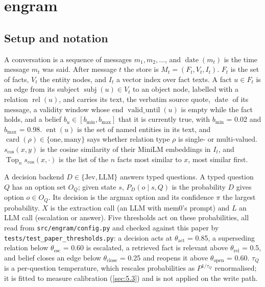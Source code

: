 \documentclass[11pt]{article}
\newcommand{\src}[1]{}
\begin{document}
\section{engram}\label{sec:3}
\subsection{Setup and notation}\label{sec:3.1}
A conversation is a sequence of messages $m_1, m_2, \ldots$, and $\operatorname{date}(m_t)$ is the time message $m_t$ was said. After message $t$ the store is $M_t = (F_t, V_t, I_t)$. $F_t$ is the set of facts, $V_t$ the entity nodes, and $I_t$ a vector index over fact texts. A fact $u \in F_t$ is an edge from its subject $\operatorname{subj}(u) \in V_t$ to an object node, labelled with a relation $\operatorname{rel}(u)$, and carries its text, the verbatim source quote, $\operatorname{date}$ of its message, a validity window whose end $\operatorname{valid\_until}(u)$ is empty while the fact holds, and a belief $b_u \in [b_{\min}, b_{\max}]$ that it is currently true, with $b_{\min}$ = 0.02\src{src/engram/config.py} and $b_{\max}$ = 0.98\src{src/engram/config.py}. $\operatorname{ent}(u)$ is the set of named entities in its text, and $\operatorname{card}(\rho) \in \{\text{one}, \text{many}\}$ says whether relation type $\rho$ is single- or multi-valued. $s_{\cos}(x, y)$ is the cosine similarity of their MiniLM embeddings in $I_t$, and $\operatorname{Top}_n s_{\cos}(x, \cdot)$ is the list of the $n$ facts most similar to $x$, most similar first.

A decision backend $D \in \{\text{Jev}, \text{LLM}\}$ answers typed questions. A typed question $Q$ has an option set $O_Q$; given state $s$, $P_D(o \mid s, Q)$ is the probability $D$ gives option $o \in O_Q$. Its decision is the argmax option and its confidence $\pi$ the largest probability. $X$ is the extraction call (an LLM with mem0's prompt) and $L$ an LLM call (escalation or answer). Five thresholds act on these probabilities, all read from \texttt{src/\allowbreak{}engram/\allowbreak{}config.py} and checked against this paper by \texttt{tests/\allowbreak{}test\_\allowbreak{}paper\_\allowbreak{}thresholds.py}: a decision acts at $\theta_{\text{act}}$ = 0.85\src{src/engram/config.py}, a superseding relation below $\theta_{\text{esc}}$ = 0.60\src{src/engram/config.py} is escalated, a retrieved fact is relevant above $\theta_{\text{rel}}$ = 0.5\src{src/engram/config.py}, and belief closes an edge below $\theta_{\text{close}}$ = 0.25\src{src/engram/config.py} and reopens it above $\theta_{\text{open}}$ = 0.60\src{src/engram/config.py}. $\tau_Q$ is a per-question temperature, which rescales probabilities as $P^{1/\tau_Q}$ renormalised; it is fitted to measure calibration (\cref{sec:5.3}) and is not applied on the write path.
\end{document}
